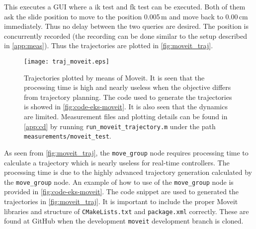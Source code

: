 This executes a GUI where a \gls{ik} test and \gls{fk} test can be executed. Both of them ask the slide position to move to the position 0.005\,m and move back to 0.00\,cm immediately. Thus no delay between the two queries are desired. The position is concurrently recorded (the recording can be done similar to the setup described in \autoref{app:meas}). Thus the trajectories are plotted in \autoref{fig:moveit_traj}.
\begin{figure}[H]
\centering
\texttt{[image: traj\_moveit.eps]}
	\caption{Trajectories plotted by means of Moveit. It is seen that the processing time is high and nearly useless when the objective differs from trajectory planning. The code used to generate the trajectories is showed in \autoref{fig:code-eks-moveit}. It is also seen that the dynamics are limited. Measurement files and plotting details can be found in \autoref{app:cd} by running \texttt{run\_moveit\_trajectory.m} under the path \texttt{measurements/moveit\_test}.}
	\label{fig:moveit_traj}
\end{figure}
As seen from \autoref{fig:moveit_traj}, the \texttt{move\_group} node requires processing time to calculate a trajectory which is nearly useless for real-time controllers. The processing time is due to the highly advanced trajectory generation calculated by the \texttt{move\_group} node. An example of how to use of the \texttt{move\_group} node is provided in \autoref{fig:code-eks-moveit}. The code snippet are used to generated the trajectories in \autoref{fig:moveit_traj}. It is important to include the proper Moveit libraries and structure of \texttt{CMakeLists.txt} and \texttt{package.xml} correctly. These are found at GitHub when the development \texttt{moveit} development branch is cloned.
